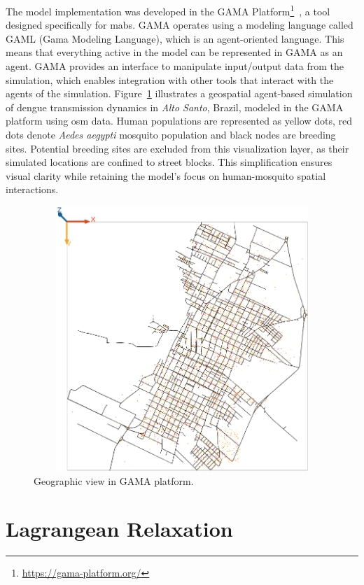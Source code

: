 The model implementation was developed in the GAMA
Platform\footnote{\url{https://gama-platform.org/}}~\citep{taillandier:2019}, a
tool designed specifically for \gls{mabs}. GAMA operates using a modeling
language called GAML (Gama Modeling Language), which is an agent-oriented
language. This means that everything active in the model can be represented in
GAMA as an agent. GAMA provides an interface to manipulate input/output data
from the simulation, which enables integration with other tools that interact
with the agents of the simulation. Figure~\ref{fig:example-gama} illustrates a
geospatial agent-based simulation of dengue transmission dynamics in
\textit{Alto Santo}, Brazil, modeled in the GAMA platform using \gls{osm} data.
Human populations are represented as yellow dots, red dots denote \textit{Aedes
	aegypti} mosquito population and black nodes are breeding sites. Potential
breeding sites are excluded from this visualization layer, as their simulated
locations are confined to street blocks. This simplification ensures visual
clarity while retaining the model’s focus on human-mosquito spatial
interactions.

\begin{figure}[!ht]
	\centering
	\includegraphics[width=16cm, height=10cm]{images/gama-example.png}
	\caption{Geographic view in GAMA platform.}
	\label{fig:example-gama}
\end{figure}



\section{Lagrangean Relaxation}\label{sec:lagrangean-relaxation}

